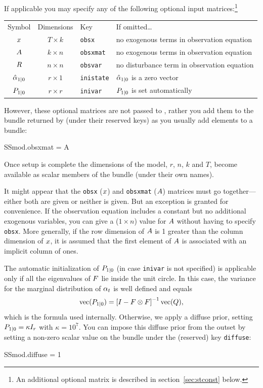 If applicable you may specify any of the following optional input
matrices:\footnote{An additional optional matrix is described in
section~\ref{sec:stconst} below.}

\begin{center}
\begin{tabular}{ccll}
Symbol & Dimensions & Key & If omitted\dots \\[6pt]
$x$ & $T \times k$ & \texttt{obsx} &
 no exogenous terms in observation equation\\
$A$ & $k \times n$ & \texttt{obsxmat} &
 no exogenous terms in observation equation\\ 
$R$ & $n \times n$ & \texttt{obsvar} & 
 no disturbance term in observation equation \\
$\hat{\alpha}_{1|0}$ & $r \times 1$ & \texttt{inistate} &
 $\hat{\alpha}_{1|0}$ is a zero vector\\
$P_{1|0}$ & $r \times r$ & \texttt{inivar} &
 $P_{1|0}$ is set automatically
\end{tabular}
\end{center}

However, these optional matrices are not passed to ,
rather you add them to the bundle returned by  (under
their reserved keys) as you usually add elements to a bundle:
\begin{code}
SSmod.obsxmat = A
\end{code}

Once setup is complete the dimensions of the model, $r$, $n$, $k$ and
$T$, become available as scalar members of the bundle (under their own
names).

It might appear that the \texttt{obsx} ($x$) and \texttt{obsxmat}
($A$) matrices must go together---either both are given or
neither is given.  But an exception is granted for convenience.  If
the observation equation includes a constant but no additional
exogenous variables, you can give a ($1 \times n$) value for
$A$ without having to specify \texttt{obsx}.  More generally,
if the row dimension of $A$ is 1 greater than the column
dimension of $x$, it is assumed that the first element of
$A$ is associated with an implicit column of ones.

The automatic initialization of $P_{1|0}$ (in case
\texttt{inivar} is not specified) is applicable only if all the
eigenvalues of $F$ lie inside the unit circle. In this case,
the variance for the marginal distribution of $\alpha_t$ is well
defined and equals
\[
\mbox{vec}(P_{1|0}) = \left[ I - F \otimes F
\right]^{-1} \mbox{vec}(Q) ,
\]
which is the formula used internally. Otherwise, we apply a diffuse
prior, setting $P_{1|0} = \kappa I_r$ with $\kappa = 10^7$.
You can impose this diffuse prior from the outset by setting a
non-zero scalar value on the bundle under the (reserved) key
\texttt{diffuse}:
%
\begin{code}
SSmod.diffuse = 1
\end{code}

